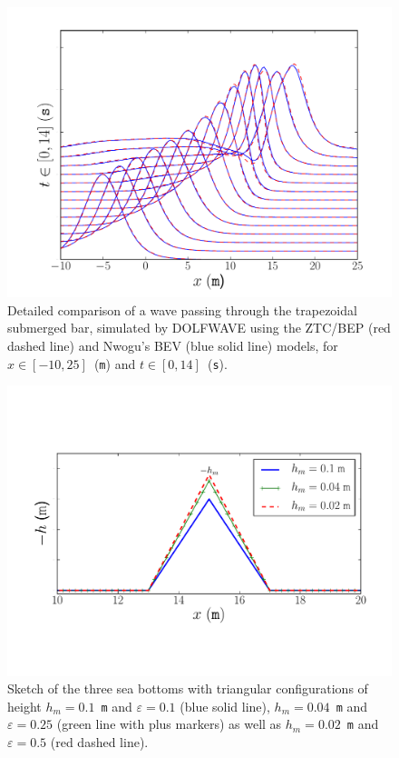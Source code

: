 \begin{figure}
\bwfig
  \centering
  \includegraphics[width=\largefig]{chapters/lopes/pdf/ZhaoNwogu.pdf}
  \caption{Detailed comparison of a wave passing through the
    trapezoidal submerged bar, simulated by DOLFWAVE using the ZTC/BEP
    (red dashed line) and Nwogu's BEV (blue solid line) models, for
    $x\in[-10,25]$~({\tt m}) and $t\in[0,14]$~({\tt s}).}
  \label{fig:lopes:zhaonwogu}
\vspace*{40pt}
\end{figure}

\begin{figure}[b!]
\bwfig
  \centering
  \includegraphics[width=\largefig]{chapters/lopes/pdf/deptheps.pdf}
  \caption{Sketch of the three sea bottoms with triangular
    configurations of height $h_m=0.1$~{\tt m} and $\varepsilon=0.1$ (blue
    solid line), $h_m=0.04$~{\tt m} and $\varepsilon=0.25$ (green line
    with plus markers) as well as $h_m=0.02$~{\tt m} and $\varepsilon=0.5$
    (red dashed line).}
  \label{fig:lopes:spikes}
\end{figure}


